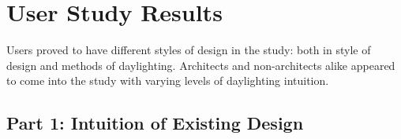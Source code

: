 \documentclass[review]{vgtc}                 %
\begin{document}

\section{User Study Results}


Users proved to have different styles of design in the study: both in style 
of design and methods of daylighting.  Architects and non-architects alike 
appeared to come into the study with varying levels of daylighting intuition.


\subsection{Part 1: Intuition of Existing Design}
\end{document}

